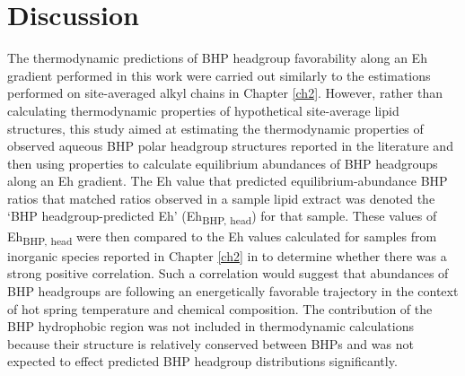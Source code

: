 

\section{Discussion}

The thermodynamic predictions of BHP headgroup favorability along an Eh gradient performed in this work were carried out similarly to the estimations performed on site-averaged alkyl chains in Chapter \ref{ch2}. However, rather than calculating thermodynamic properties of hypothetical site-average lipid structures, this study aimed at estimating the thermodynamic properties of observed aqueous BHP polar headgroup structures reported in the literature and then using properties to calculate equilibrium abundances of BHP headgroups along an Eh gradient. The Eh value that predicted equilibrium-abundance BHP ratios that matched ratios observed in a sample lipid extract was denoted the `BHP headgroup-predicted Eh' (Eh\textsubscript{BHP, head}) for that sample. These values of Eh\textsubscript{BHP, head} were then compared to the Eh values calculated for samples from inorganic species reported in Chapter \ref{ch2} in to determine whether there was a strong positive correlation. Such a correlation would suggest that abundances of BHP headgroups are following an energetically favorable trajectory in the context of hot spring temperature and chemical composition. The contribution of the BHP hydrophobic region was not included in thermodynamic calculations because their structure is relatively conserved between BHPs and was not expected to effect predicted BHP headgroup distributions significantly.

